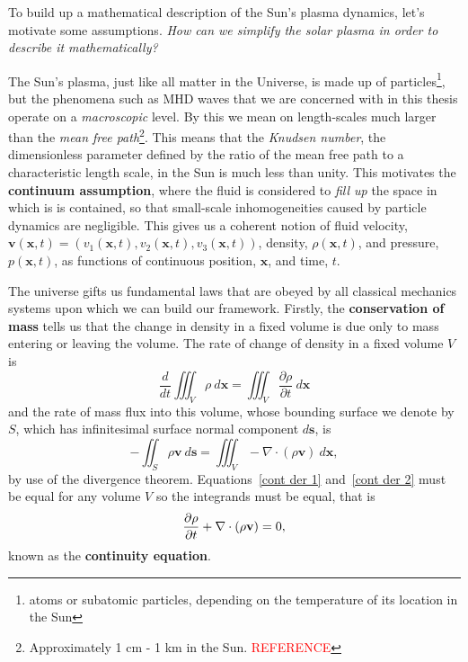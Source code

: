 \documentclass[12pt]{../style-files/ociamthesis}
\begin{document}
To build up a mathematical description of the Sun's plasma dynamics, let's motivate some assumptions. \textit{How can we simplify the solar plasma in order to describe it mathematically?}

The Sun's plasma, just like all matter in the Universe, is made up of particles\footnote{atoms or subatomic particles, depending on the temperature of its location in the Sun}, but the phenomena such as MHD waves that we are concerned with in this thesis operate on a \textit{macroscopic} level. By this we mean on length-scales much larger than the \textit{mean free path}\footnote{Approximately 1 cm - 1 km in the Sun. \textcolor{red}{REFERENCE}}. This means that the \textit{Knudsen number}, the dimensionless parameter defined by the ratio of the mean free path to a characteristic length scale, in the Sun is much less than unity. This motivates the \textbf{continuum assumption}, where the fluid is considered to \textit{fill up} the space in which is is contained, so that small-scale inhomogeneities caused by particle dynamics are negligible. This gives us a coherent notion of fluid velocity, $\mathbf{v}(\mathbf{x}, t) = (v_1(\mathbf{x}, t), v_2(\mathbf{x}, t), v_3(\mathbf{x}, t))$, density, $\rho(\mathbf{x}, t)$, and pressure, $p(\mathbf{x}, t)$, as functions of continuous position, $\mathbf{x}$, and time, $t$.

The universe gifts us fundamental laws that are obeyed by all classical mechanics systems upon which we can build our framework. Firstly, the \textbf{conservation of mass} tells us that the change in density in a fixed volume is due only to mass entering or leaving the volume. The rate of change of density in a fixed volume $V$ is
\begin{equation}
	\frac{d}{dt} \iiint_V \rho ~d\mathbf{x} = \iiint_V \frac{\partial\rho}{\partial t} ~d\mathbf{x} \label{cont der 1}
\end{equation}
and the rate of mass flux into this volume, whose bounding surface we denote by $S$, which has infinitesimal surface normal component $d\mathbf{s}$, is
\begin{equation}
	-\iint_S \rho \mathbf{v} ~d\mathbf{s} = \iiint_V -\nabla\cdot(\rho\mathbf{v}) ~d\mathbf{x}, \label{cont der 2}
\end{equation}
by use of the divergence theorem. Equations~\eqref{cont der 1} and~\eqref{cont der 2} must be equal for any volume $V$ so the integrands must be equal, that is
\begin{equation}
	\frac{\partial\rho}{\partial t} + \nabla\cdot(\rho \mathbf{v}) = 0, \label{cont eqn}
\end{equation}
known as the \textbf{continuity equation}.
\end{document}

